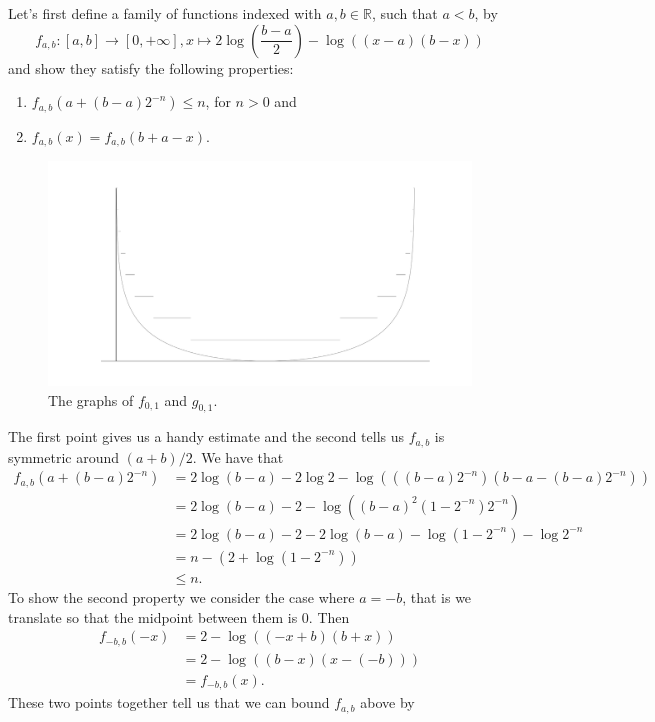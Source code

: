 \documentclass[a4paper,12pt,twoside,BCOR=10mm]{scrbook}
\theoremstyle{definition}
\theoremstyle{definition}
\theoremstyle{definition}
\begin{document}
Let's first define a family of functions indexed with $a, b \in \mathbb{R}$, such that $a < b$, by
\[
\label{index30}
	f_{a, b}: [a, b] \rightarrow [0, +\infty],
	x \mapsto 2\log \left ( \frac{b - a}{2} \right ) - \log((x - a)(b - x))
\]
and show they satisfy the following properties:
\begin{enumerate}
\item
$f_{a, b}(a + (b - a)2^{-n}) \leq n$, for $n > 0$ and
\item
$f_{a, b}(x) = f_{a, b}(b + a - x)$.
\end{enumerate}
\begin{figure}[h]
\centering
\includegraphics[width=1\textwidth]{graph2}
\caption{The graphs of $f_{0, 1}$ and $g_{0, 1}$.}
\end{figure}
The first point gives us a handy estimate and the second tells us $f_{a, b}$ is symmetric around $(a + b)/2$.
We have that
\begin{align*}
	f_{a, b}(a + (b - a)2^{-n})
	&= 2\log (b - a) - 2\log 2 - \log (((b - a)2^{-n})(b - a - (b - a)2^{-n}))\\
	&= 2\log (b - a) - 2 - \log ((b - a)^2(1 - 2^{-n})2^{-n})\\
	&= 2\log (b - a) - 2 - 2\log (b - a) - \log (1 - 2^{-n}) - \log 2^{-n}\\
	&= n - (2 + \log (1 - 2^{-n}))\\
	&\leq n.
\end{align*}
To show the second property we consider the case where $a = -b$, that is we translate so that the midpoint between them is $0$.
Then
\begin{align*}
f_{-b, b}(-x)
&= 2 - \log ((-x + b)(b + x))\\
&= 2 - \log ((b - x)(x - (-b)))\\
&= f_{-b, b}(x).
\end{align*}
These two points together tell us that we can bound $f_{a, b}$ above by
\end{document}
